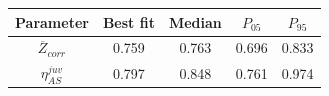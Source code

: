 \begin{tabular}{ccccc}
\toprule
Parameter & Best fit & Median & $P_{05}$ & $P_{95}$\\
\midrule
$\overline{Z}_{corr}$ & 0.759 & 0.763 & 0.696 & 0.833\\
$\eta_{AS}^{juv}$ & 0.797 & 0.848 & 0.761 & 0.974\\
\bottomrule
\end{tabular}
